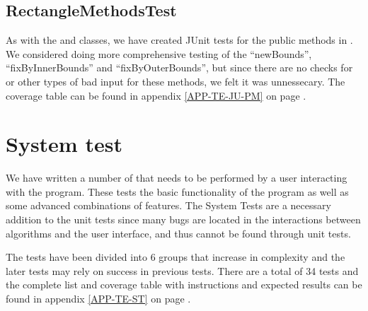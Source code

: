 \subsection{RectangleMethodsTest}
\label{TEST-JU-RMT}
As with the  and  classes, we have created
JUnit tests for the public methods in . We considered
doing more comprehensive testing of the ``newBounds'', ``fixByInnerBounds'' and
``fixByOuterBounds'', but since there are no checks for  or other
types of bad input for these methods, we felt it was unnessecary. The coverage
table can be found in appendix \ref{APP-TE-JU-PM} on page
\pageref{APP-TE-JU-PM}.

\section{System test}
\label{TEST-ST}
We have written a number of  that needs to be performed by a
user interacting with the program. These tests the basic functionality of the
program as well as some advanced combinations of features. The System Tests are
a necessary addition to the unit tests since many bugs are located in the
interactions between algorithms and the user interface, and thus cannot be found
through unit tests. 

The tests have been divided into 6 groups that increase in
complexity and the later tests may rely on success in previous tests. There are
a total of 34 tests and the complete list and coverage table with instructions
and expected results can be found in appendix \ref{APP-TE-ST} on page
\pageref{APP-TE-ST}.